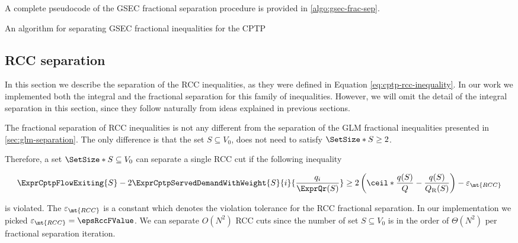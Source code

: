 A complete pseudocode of the GSEC fractional separation procedure is provided in \cref{algo:gsec-frac-sep}.

\begin{algorithm}
	\caption{An algorithm for separating GSEC fractional inequalities for the CPTP}
	\label{algo:gsec-frac-sep}
	
\end{algorithm}

\subsection{RCC separation}
\label{sec:impl-rcc-separation}

In this section we describe the separation of the RCC inequalities, as they were defined in Equation \eqref{eq:cptp-rcc-inequality}.
In our work we implemented both the integral and the fractional separation for this family of inequalities.
However, we will omit the detail of the integral separation in this section, since they follow naturally from ideas explained in previous sections.

The fractional separation of RCC inequalities is not any different from the separation of the GLM fractional inequalities presented in \cref{sec:glm-separation}.
The only difference is that the set $S \subseteq V_0$, does not need to satisfy $\SetSize*{S} \ge 2$.

Therefore, a set $\SetSize*{S} \subseteq V_0$ can separate a single RCC cut if the following inequality

\begin{equation}
	\begin{split}
		\ExprCptpFlowExiting{S} -2 \ExprCptpServedDemandWithWeight{S}{i}{\frac{q_i}{\ExprQr(S)}}    \ge   2 \left( \ceil*{ \frac{q(S)}{Q}} - \frac{q(S)}{Q_{\mathrm{R}}(S)} \right) - \varepsilon_{\mt{RCC}}
	\end{split}
\end{equation}

is violated.
The $\varepsilon_{\mt{RCC}}$ is a constant which denotes the violation tolerance for the RCC fractional separation.
In our implementation we picked $\varepsilon_{\mt{RCC}} = \epsRccFValue$.
We can separate $O(N^2)$ RCC cuts since the number of set $S \subseteq V_0$ is in the order of $\Theta(N^2)$ per fractional separation iteration.

